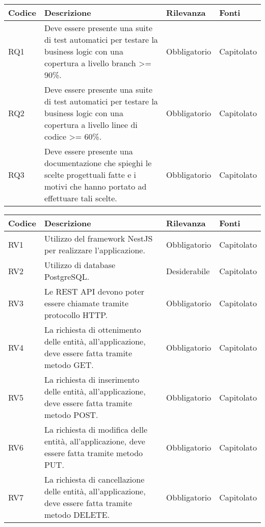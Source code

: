 \leavevmode\newline
\begin{table}
    \begin{tabular}{|p{1cm}|p{6cm}|p{1.9cm}|p{1.8cm}|} 
    \hline
    Codice & Descrizione & Rilevanza &  Fonti \\ 
    \hline
    RQ1 & Deve essere presente una suite di test automatici per testare la business logic con una copertura a livello branch
        >= 90\%. & Obbligatorio & Capitolato \\ 
    \hline
    RQ2 & Deve essere presente una suite di test automatici per testare la business logic con una copertura a livello linee
        di codice >= 60\%. & Obbligatorio & Capitolato \\ 
    \hline
    RQ3 & Deve essere presente una documentazione che spieghi le scelte progettuali fatte e i motivi che hanno portato ad effettuare
        tali scelte. & Obbligatorio & Capitolato \\ 
    \hline
    \end{tabular}
\end{table}

\leavevmode\newline
\begin{table}
    \begin{tabular}{|p{1cm}|p{6cm}|p{1.9cm}|p{1.8cm}|} 
    \hline
    Codice & Descrizione & Rilevanza &  Fonti \\ 
    \hline
    RV1 & Utilizzo del framework NestJS per realizzare l'applicazione. & Obbligatorio & Capitolato \\ 
    \hline
    RV2 & Utilizzo di database PostgreSQL. & Desiderabile & Capitolato \\ 
    \hline
    RV3 & Le REST API devono poter essere chiamate tramite protocollo HTTP. & Obbligatorio & Capitolato \\ 
    \hline
    RV4 & La richiesta di ottenimento delle entità, all'applicazione, deve essere fatta tramite metodo GET. & 
        Obbligatorio & Capitolato \\ 
    \hline
    RV5 & La richiesta di inserimento delle entità, all'applicazione, deve essere fatta tramite metodo POST. & 
        Obbligatorio & Capitolato \\ 
    \hline
    RV6 & La richiesta di modifica delle entità, all'applicazione, deve essere fatta tramite metodo PUT. & 
        Obbligatorio & Capitolato \\ 
    \hline
    RV7 & La richiesta di cancellazione delle entità, all'applicazione, deve essere fatta tramite metodo DELETE. & 
        Obbligatorio & Capitolato \\ 
    \hline
    \end{tabular}
\end{table}